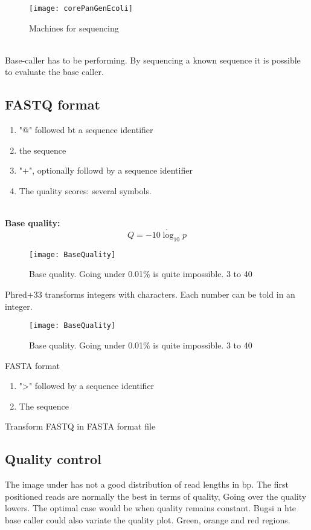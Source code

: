 \begin{figure}[h]
\caption{Machines for sequencing}\label{balancepancore}
\centering
\texttt{[image: corePanGenEcoli]}
\end{figure}

\\

Base-caller has to be performing. By sequencing a known sequence it is possible to evaluate the base caller.

\subsection{FASTQ format}
\begin{enumerate}
\item "@" followed bt a sequence identifier
\item the sequence
\item "+", optionally followd by a sequence identifier
\item The quality scores: several symbols.
\end{enumerate}

\\

\textbf{Base quality: 
}
$$ Q = -10 \dot \log_10{p} $$ 

\begin{figure}[h]
\caption{Base quality. Going under 0.01\% is quite impossible. 3 to 40} \label{basequal}
\centering
\texttt{[image: BaseQuality]}
\end{figure}

Phred+33 transforms integers with characters. Each number can be told in an integer. 


\begin{figure}[h]
\caption{Base quality. Going under 0.01\% is quite impossible. 3 to 40} \label{basequal}
\centering
\texttt{[image: BaseQuality]}
\end{figure}


FASTA format

\begin{enumerate}
\item ">" followed by a sequence identifier
\item The sequence
\end{enumerate}


Transform FASTQ in FASTA format file

\subsection{Quality control}
The image under has not a good distribution of read lengths in bp. The first positioned reads are normally the best in terms of quality, Going over the quality lowers. The optimal case would be when quality remains constant. Bugsi n hte base caller could also variate the quality plot. Green, orange and red regions. 

